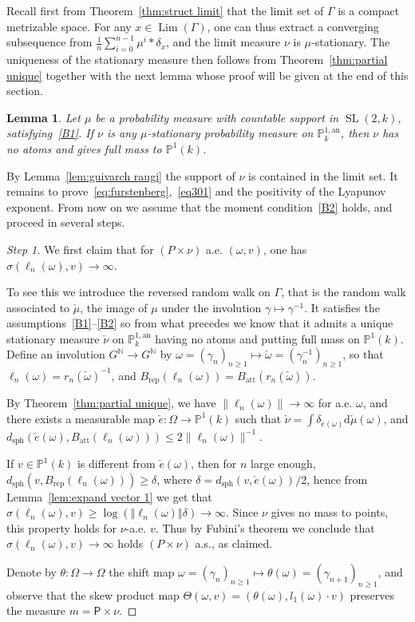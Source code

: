 \documentclass[10pt]{amsart}
\newtheorem{lemm}[theo]{Lemma}\newtheorem{prop}[theo]{Proposition}\newtheorem{coro}[theo]{Corollary}\newtheorem{conj}[theo]{Conjecture}
\theoremstyle{definition}\newtheorem{defi}[theo]{Definition}\newtheorem{rema}[theo]{Remark}\newtheorem{exam}[theo]{Example}\newtheorem{exem}[theo]{Example}\newtheorem{nota}[theo]{Notation}
\DeclareMathOperator{\Lm}{Lim}
\DeclareMathOperator{\sph}{sph}
\DeclareMathOperator{\SL}{SL}
\newcommand{\nn}{\mathbb{N}}
\newcommand{\pp}{\mathbb{P}}
\newcommand{\prob}{\mathsf{P}}
\newcommand{\cv}{\rightarrow}
\newcommand{\norm}[1]{\left\Vert#1\right\Vert}
\newcommand{\PP}{\mathbb{P}}
\newcommand{\berk}{{\mathbb{P}^{1, \mathrm{an}}_k}}
\newcommand{\att}{\mathrm{att}}
\newcommand{\rep}{\mathrm{rep}}
\newcommand{\SLk}{\SL(2,k)}
\newcommand*{\dd}{\mathrm{d}}
\newenvironment{step}{\begin{proof}}{\let\qed\relax \end{proof}}
\begin{document}
Recall first from Theorem~\ref{thm:struct limit} that the limit set of $\Gamma$ is a compact metrizable space. For any $x\in \Lm(\Gamma)$, one can thus extract a converging subsequence from $\frac1{n} \sum_{i=0}^{n-1}\mu^ i \ast \delta_{x}$, and the limit measure $\nu$ is $\mu$-stationary. The uniqueness of the stationary measure then follows from Theorem~\ref{thm:partial unique} together with the next lemma whose proof will be given at the end of this section.

\begin{lemm}\label{lem:Hk}
Let $\mu$ be a probability measure with countable support in $\SLk$, satisfying~\eqref{B1}. If $\nu$ is any $\mu$-stationary probability measure on $\berk$, then $\nu$ has no atoms and gives full mass to $ \PP^1(k)$.
\end{lemm}

By Lemma~\ref{lem:guivarch raugi} the support of $\nu$ is contained in the limit set. It remains to prove~\eqref{eq:furstenberg},~\eqref{eq301} and the positivity of the Lyapunov exponent. From now on we assume that the moment condition~\eqref{B2} holds, and proceed in several steps.

\begin{step}[Step 1]
We first claim that for $(P\times \nu)$ a.e. $(\omega,v)$, one has $\sigma(\ell_n(\omega), v)\cv\infty$.

To see this we introduce the reversed random walk on $\Gamma$, that is the random walk associated to $\check \mu$, the image of $\mu$ under the involution $\gamma\mapsto \gamma^{-1}$. It satisfies the assumptions~\eqref{B1}--\eqref{B2} so from what precedes we know that it admits a unique stationary measure $\check\nu$ on $\berk$ having no atoms and putting full mass on $\PP^1(k)$. Define an involution $G^\nn\to G^\nn$ by $\omega = (\gamma_n)_{n\geq 1 }\mapsto \check \omega = (\gamma_n^{-1})_{n\geq 1}$, so that $\ell_n(\omega) = r_n(\check \omega)^{-1}$, and $B_{\rep}(\ell_n(\omega)) = B_{\att}(r_n(\check \omega))$.

By Theorem~\ref{thm:partial unique}, we have $\| \ell_n(\omega)\| \to \infty$ for a.e. $\omega$, and there exists a measurable map $\check{e}: \Omega \to \PP^1(k)$ such that $\check \nu = \int \delta_{\check e(\omega)} \dd\check\mu(\omega)$, and $d_{\sph}(\check e(\omega), B_\att(\ell_n(\omega))) \le 2\| \ell_n(\omega)\|^{-1}$.

If $v\in \pp^1(k)$ is different from $\check e(\omega)$, then for $n$ large enough, $d_{\mathrm{sph}}(v, B_{\rep}(\ell_n(\omega)))\geq \delta$, where $\delta = d_{\mathrm{sph}}(v, \check e(\omega))/2$, hence from Lemma~\ref{lem:expand vector 1} we get that $\sigma(\ell_n(\omega), v)\geq \log (\norm {\ell_n(\omega)}\delta)\to \infty$. Since $\nu$ gives no mass to points, this property holds for $\nu$-a.e. $v$. Thus by Fubini's theorem we conclude that $\sigma(\ell_n(\omega), v)\cv\infty$ holds $(P\times \nu)$ a.s., as claimed.

Denote by $\theta : \Omega \to \Omega$ the shift map $\omega = (\gamma_n)_{n\ge 1} \mapsto \theta(\omega) = (\gamma_{n+1})_{n\ge 1}$, and observe that the skew product map $\Theta(\omega,v) = (\theta(\omega), l_1(\omega) \cdot v)$ preserves the measure $m = \prob\times \nu$.
\end{step}
\end{document}
